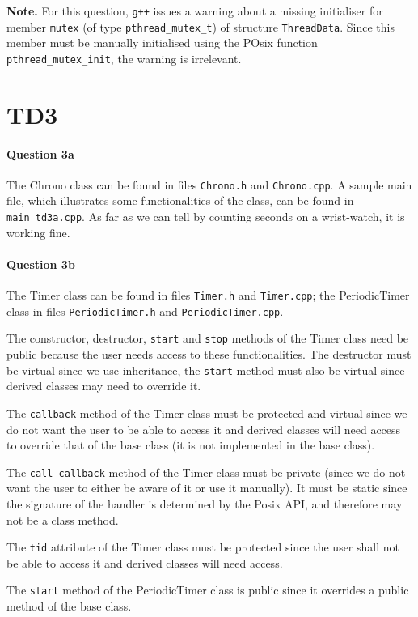 \documentclass[a4paper,oneside,11pt]{article}
\begin{document}
\textbf{Note.} For this question, \texttt{g++} issues a warning about a missing initialiser for member \texttt{mutex} (of type \texttt{pthread\_mutex\_t}) of structure \texttt{ThreadData}. Since this member must be manually initialised using the POsix function \texttt{pthread\_mutex\_init}, the warning is irrelevant.

\section*{TD3}
\paragraph{Question 3a} The Chrono class can be found in files \texttt{Chrono.h} and \texttt{Chrono.cpp}. A sample main file, which illustrates some functionalities of the class, can be found in \texttt{main\_td3a.cpp}. As far as we can tell by counting seconds on a wrist-watch, it is working fine.

\paragraph{Question 3b} The Timer class can be found in files \texttt{Timer.h} and \texttt{Timer.cpp}; the PeriodicTimer class in files \texttt{PeriodicTimer.h} and \texttt{PeriodicTimer.cpp}.

The constructor, destructor, \texttt{start} and \texttt{stop} methods of the Timer class need be public because the user needs access to these functionalities. The destructor must be virtual since we use inheritance, the \texttt{start} method must also be virtual since derived classes may need to override it.

The \texttt{callback} method of the Timer class must be protected and virtual since we do not want the user to be able to access it and derived classes will need access to override that of the base class (it is not implemented in the base class).

The \texttt{call\_callback} method of the Timer class must be private (since we do not want the user to either be aware of it or use it manually). It must be static since the signature of the handler is determined by the Posix API, and therefore may not be a class method.

The \texttt{tid} attribute of the Timer class must be protected since the user shall not be able to access it and derived classes will need access.

The \texttt{start} method of the PeriodicTimer class is public since it overrides a public method of the base class.
\end{document}
